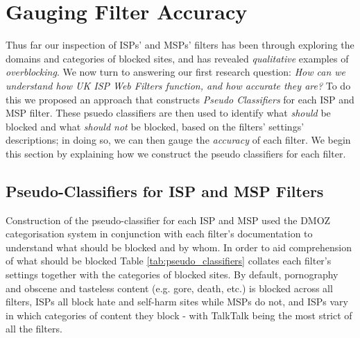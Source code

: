 \documentclass{bmcart}
\begin{document}
\section*{Gauging Filter Accuracy}
Thus far our inspection of ISPs' and MSPs' filters has been through exploring the domains and categories of blocked sites, and has revealed \textit{qualitative} examples of \textit{overblocking}.
We now turn to answering our first research question: \textit{How can we understand how UK ISP Web Filters function, and how accurate they are?}
To do this we proposed an approach that constructs \textit{Pseudo Classifiers} for each ISP and MSP filter.
These psuedo classifiers are then used to identify what \textit{should} be blocked and what \textit{should not} be blocked, based on the filters' settings' descriptions; in doing so, we can then gauge the \textit{accuracy} of each filter.
We begin this section by explaining how we construct the pseudo classifiers for each filter.

\subsection*{Pseudo-Classifiers for ISP and MSP Filters}
Construction of the pseudo-classifier for each ISP and MSP used the DMOZ categorisation system in conjunction with each filter's documentation to understand what should be blocked and by whom.
In order to aid comprehension of what should be blocked Table \ref{tab:pseudo_classifiers} collates each filter's settings together with the categories of blocked sites.
By default, pornography and obscene and tasteless content (e.g. gore, death, etc.) is blocked across all filters, ISPs all block hate and self-harm sites while MSPs do not, and ISPs vary in which categories of content they block - with TalkTalk being the most strict of all the filters.
\end{document}

